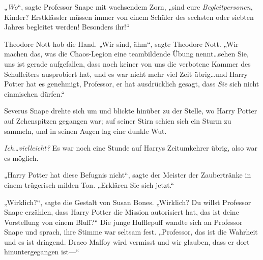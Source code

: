 „\emph{Wo}“, sagte Professor Snape mit wachsendem Zorn, „sind eure \emph{Begleitpersonen}, Kinder? Erstklässler müssen immer von einem Schüler des sechsten oder siebten Jahres begleitet werden! Besonders ihr!“

Theodore Nott hob die Hand. „Wir sind, ähm“, sagte Theodore Nott.
„Wir machen das, was die Chaos-Legion eine teambildende Übung nennt…sehen Sie, uns ist gerade aufgefallen, dass noch keiner von uns die verbotene Kammer des Schulleiters ausprobiert hat, und es war nicht mehr viel Zeit übrig…und Harry Potter hat es genehmigt, Professor, er hat ausdrücklich gesagt, dass \emph{Sie} sich nicht einmischen dürfen.“

Severus Snape drehte sich um und blickte hinüber zu der Stelle, wo Harry Potter auf Zehenspitzen gegangen war; auf seiner Stirn schien sich ein Sturm zu sammeln, und in seinen Augen lag eine dunkle Wut.

\emph{Ich…vielleicht?}
Es war noch eine Stunde auf Harrys Zeitumkehrer übrig, also war es möglich.

„Harry Potter hat diese Befugnis nicht“, sagte der Meister der Zaubertränke in einem trügerisch milden Ton. „Erklären Sie sich jetzt.“

„Wirklich?“, sagte die Gestalt von Susan Bones. „Wirklich? Du willst Professor Snape erzählen, dass Harry Potter die Mission autorisiert hat, das ist deine Vorstellung von einem Bluff?“ Die junge Hufflepuff wandte sich an Professor Snape und sprach, ihre Stimme war seltsam fest.
„Professor, das ist die Wahrheit und es ist dringend. Draco Malfoy wird vermisst und wir glauben, dass er dort hinuntergegangen ist—“

